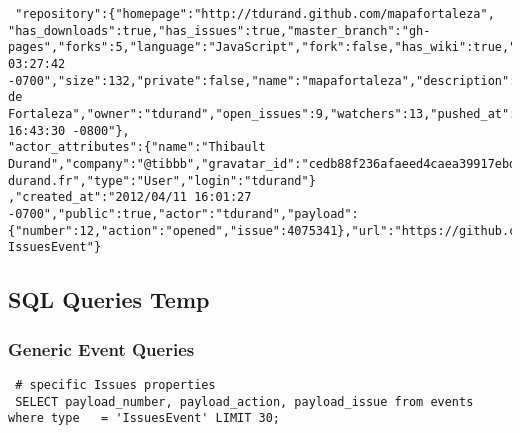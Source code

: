 \documentclass[a4paper,10pt]{article}
\begin{document}
\begin{lstlisting}
 "repository":{"homepage":"http://tdurand.github.com/mapafortaleza",
"has_downloads":true,"has_issues":true,"master_branch":"gh-pages","forks":5,"language":"JavaScript","fork":false,"has_wiki":true,"url":"https://github.com/tdurand/mapafortaleza","created_at":"2011/09/29 03:27:42 -0700","size":132,"private":false,"name":"mapafortaleza","description":"Mapa de Fortaleza","owner":"tdurand","open_issues":9,"watchers":13,"pushed_at":"2012/02/29 16:43:30 -0800"},
"actor_attributes":{"name":"Thibault Durand","company":"@tibbb","gravatar_id":"cedb88f236afaeed4caea39917ebd0a7","blog":"http://www.thibault-durand.fr","type":"User","login":"tdurand"}
,"created_at":"2012/04/11 16:01:27 -0700","public":true,"actor":"tdurand","payload":{"number":12,"action":"opened","issue":4075341},"url":"https://github.com/tdurand/mapafortaleza/issues/12","type":"
IssuesEvent"}
\end{lstlisting}


\subsection{SQL Queries Temp}


\subsubsection{Generic Event Queries}
\begin{lstlisting}
 # specific Issues properties
 SELECT payload_number, payload_action, payload_issue from events where type   = 'IssuesEvent' LIMIT 30;

\end{lstlisting}
\end{document}
